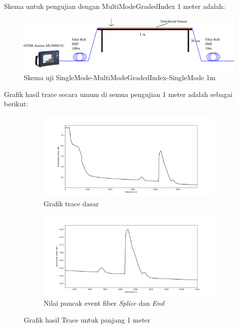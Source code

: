 \documentclass[12pt]{article}
\begin{document}
	Skema untuk pengujian dengan MultiModeGradedIndex 1 meter adalah:
	
	\begin{figure}[!h]
		\centering
		\captionsetup{justification=centering}
		\includegraphics[width=0.7\linewidth]{images/Bab_4/uji_1m}
		\caption[Trace SMF-SMF]{\small{Skema uji SingleMode-MultiModeGradedIndex-SingleMode 1m}}
	\end{figure}
	
	Grafik hasil trace secara umum di semua pengujian 1 meter adalah sebagai berikut:
	
	\begin{figure}[!h]
		\centering
		\captionsetup{justification=centering}
		\begin{subfigure}[h]{0.8\textwidth}
			\includegraphics[width=\textwidth]{images/Bab_4/Bab_4_5d1}	
			\caption{\small{Grafik trace dasar}}		
		\end{subfigure}
		\begin{subfigure}[h]{0.8\textwidth}
			\includegraphics[width=\linewidth]{images/Bab_4/Bab_4_5d2}
			\caption{\small{Nilai puncak event fiber \textit{Splice} dan \textit{End}}}			
		\end{subfigure}
		\caption[Uji Pagar]{\small{Grafik hasil Trace untuk panjang 1 meter}}
	\end{figure}
\end{document}
